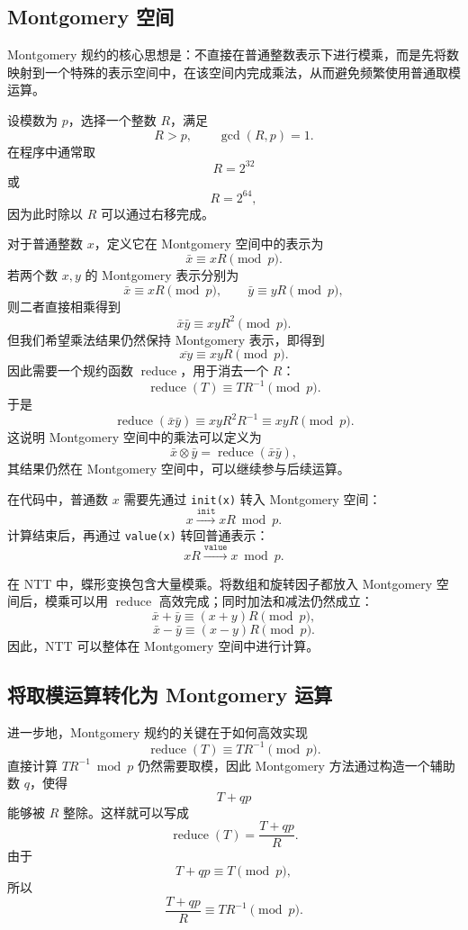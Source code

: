 \documentclass[a4paper]{article}
\begin{document}
\subsection{Montgomery 空间}

Montgomery 规约的核心思想是：不直接在普通整数表示下进行模乘，而是先将数映射到一个特殊的表示空间中，在该空间内完成乘法，从而避免频繁使用普通取模运算。

设模数为 \(p\)，选择一个整数 \(R\)，满足
\[
R>p,\qquad \gcd(R,p)=1.
\]
在程序中通常取
\[
R=2^{32}
\]
或
\[
R=2^{64},
\]
因为此时除以 \(R\) 可以通过右移完成。

对于普通整数 \(x\)，定义它在 Montgomery 空间中的表示为
\[
\bar{x}\equiv xR\pmod p.
\]
若两个数 \(x,y\) 的 Montgomery 表示分别为
\[
\bar{x}\equiv xR\pmod p,\qquad
\bar{y}\equiv yR\pmod p,
\]
则二者直接相乘得到
\[
\bar{x}\bar{y}\equiv xyR^2\pmod p.
\]
但我们希望乘法结果仍然保持 Montgomery 表示，即得到
\[
\overline{xy}\equiv xyR\pmod p.
\]
因此需要一个规约函数 \(\operatorname{reduce}\)，用于消去一个 \(R\)：
\[
\operatorname{reduce}(T)\equiv TR^{-1}\pmod p.
\]
于是
\[
\operatorname{reduce}(\bar{x}\bar{y})
\equiv xyR^2R^{-1}
\equiv xyR
\pmod p.
\]
这说明 Montgomery 空间中的乘法可以定义为
\[
\bar{x}\otimes\bar{y}
=
\operatorname{reduce}(\bar{x}\bar{y}),
\]
其结果仍然在 Montgomery 空间中，可以继续参与后续运算。

在代码中，普通数 \(x\) 需要先通过 \texttt{init(x)} 转入 Montgomery 空间：
\[
x \xrightarrow{\texttt{init}} xR\bmod p.
\]
计算结束后，再通过 \texttt{value(x)} 转回普通表示：
\[
xR \xrightarrow{\texttt{value}} x\bmod p.
\]

在 NTT 中，蝶形变换包含大量模乘。将数组和旋转因子都放入 Montgomery 空间后，模乘可以用 \(\operatorname{reduce}\) 高效完成；同时加法和减法仍然成立：
\[
\bar{x}+\bar{y}\equiv (x+y)R\pmod p,
\]
\[
\bar{x}-\bar{y}\equiv (x-y)R\pmod p.
\]
因此，NTT 可以整体在 Montgomery 空间中进行计算。


\subsection{将取模运算转化为 Montgomery 运算}

进一步地，Montgomery 规约的关键在于如何高效实现
\[
\operatorname{reduce}(T)\equiv TR^{-1}\pmod p.
\]
直接计算 \(TR^{-1}\bmod p\) 仍然需要取模，因此 Montgomery 方法通过构造一个辅助数 \(q\)，使得
\[
T+qp
\]
能够被 \(R\) 整除。这样就可以写成
\[
\operatorname{reduce}(T)=\frac{T+qp}{R}.
\]
由于
\[
T+qp\equiv T\pmod p,
\]
所以
\[
\frac{T+qp}{R}\equiv TR^{-1}\pmod p.
\]
\end{document}
